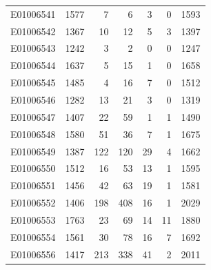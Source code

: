 \documentclass[
  letterpaper,
  DIV=11,
  numbers=noendperiod]{scrreprt}
\begin{document}
\begin{tabular}{lrrrrrr}
E01006541     &    1577 &       7 &                     6 &                               3 &                       0 &              1593 \\
E01006542     &    1367 &      10 &                    12 &                               5 &                       3 &              1397 \\
E01006543     &    1242 &       3 &                     2 &                               0 &                       0 &              1247 \\
E01006544     &    1637 &       5 &                    15 &                               1 &                       0 &              1658 \\
E01006545     &    1485 &       4 &                    16 &                               7 &                       0 &              1512 \\
E01006546     &    1282 &      13 &                    21 &                               3 &                       0 &              1319 \\
E01006547     &    1407 &      22 &                    59 &                               1 &                       1 &              1490 \\
E01006548     &    1580 &      51 &                    36 &                               7 &                       1 &              1675 \\
E01006549     &    1387 &     122 &                   120 &                              29 &                       4 &              1662 \\
E01006550     &    1512 &      16 &                    53 &                              13 &                       1 &              1595 \\
E01006551     &    1456 &      42 &                    63 &                              19 &                       1 &              1581 \\
E01006552     &    1406 &     198 &                   408 &                              16 &                       1 &              2029 \\
E01006553     &    1763 &      23 &                    69 &                              14 &                      11 &              1880 \\
E01006554     &    1561 &      30 &                    78 &                              16 &                       7 &              1692 \\
E01006556     &    1417 &     213 &                   338 &                              41 &                       2 &              2011 \\

\end{tabular}
\end{document}
